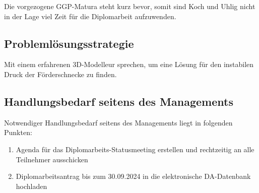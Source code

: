\documentclass[
	headings=optiontotocandhead,%
	oneside,
	numbers=noenddot,%
	toc=flat, %
	10pt, %
	parskip=full, %
	listof=totoc, %
	listof=flat, %
	numbers=noenddot, %
	bibliography=totoc, %
	a4paper,DIV=14,
]{scrartcl}
\begin{document}
Die vorgezogene GGP-Matura steht kurz bevor, somit sind Koch und Uhlig nicht in der Lage viel Zeit für die Diplomarbeit aufzuwenden. 

\subsection{Problemlösungsstrategie}
Mit einem erfahrenen 3D-Modelleur sprechen, um eine Lösung für den instabilen Druck der Förderschnecke zu finden.

\subsection{Handlungsbedarf seitens des Managements}
Notwendiger Handlungsbedarf seitens des Managements liegt in folgenden Punkten:

\begin{enumerate}
	\item Agenda für das Diplomarbeits-Statusmeeting erstellen und rechtzeitig an alle Teilnehmer ausschicken
	\item Diplomarbeitsantrag bis zum 30.09.2024 in die elektronische DA-Datenbank hochladen
\end{enumerate}
\end{document}
